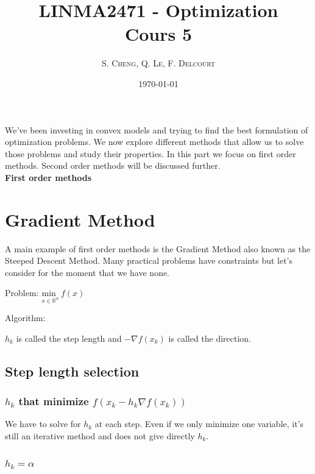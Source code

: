 \documentclass[a4paper, 11pt]{article}
\title{LINMA2471 - Optimization\\
Cours 5}
\author{S. \textsc{Cheng}, Q. \textsc{Le}, F. \textsc{Delcourt}}
\date{\today}
\begin{document}
 
\maketitle


We've been investing in convex models and trying to find the best formulation of optimization problems. We now explore different methods that allow us to solve those problems and study their properties. In this part we focus on first order methods. Second order methods will be discussed further. \\

{\Large \textbf{First order methods}}  \\

\section{Gradient Method}

 A main example of first order methods is the Gradient Method also known as the Steeped Descent Method. Many practical problems have constraints but let's consider for the moment that we have none.  
 
 Problem:  $\underset{x  \in \mathbb{R}^n}{\text{min }} \: f(x) $
 
 Algorithm:
 
 \noindent{}

$h_k$ is called the step length and $-\nabla f(x_k)$ is called the direction.

\subsection{Step length selection}

\subsubsection{ $h_k$ that minimize $f(x_k - h_k \nabla f(x_k))$} 

We have to solve for $h_k$ at each step. Even if we only minimize one variable, it's still an iterative method and does not give directly $h_k$. 

\subsubsection{$h_k = \alpha$}
\end{document}

